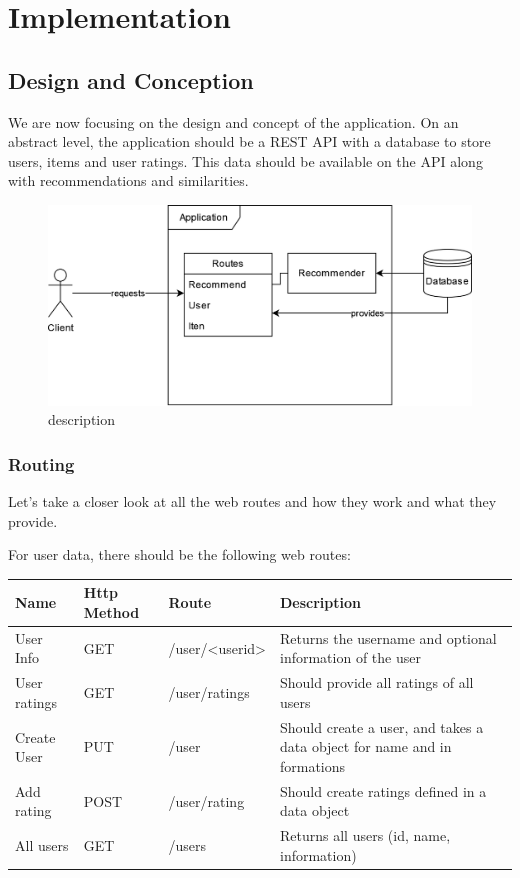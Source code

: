 \chapter{Implementation}

\section{Design and Conception}

We are now focusing on the design and concept of the application. On an abstract level, the application should be a REST API with a database to store users, items and user ratings. This data should be available on the API along with recommendations and similarities.

\begin{figure}[h]
\centering
\includegraphics[width=\textwidth]{images/BPMN_design}
\caption{\label{fig:design}description}
\end{figure}

\subsection{Routing}

Let's take a closer look at all the web routes and how they work and what they provide.

For user data, there should be the following web routes:

\begin{longtable}{|p{2.5cm}|p{2.5cm}|p{3.2cm}|p{5cm}|}
    \hline
	  Name & Http Method & Route & Description \\
    \hline
    \hline
    User Info & GET & /user/<userid> & Returns the username and optional information of the user\\
    \hline
    User ratings & GET & /user/ratings & Should provide all ratings of all users\\
    \hline
    Create User & PUT & /user & Should create a user, and takes a data object for name and in formations\\
    \hline
    Add rating & POST & /user/rating & Should create ratings defined in a data object\\
    \hline
    All users & GET & /users & Returns all users (id, name, information)\\
    \hline
\end{longtable}

